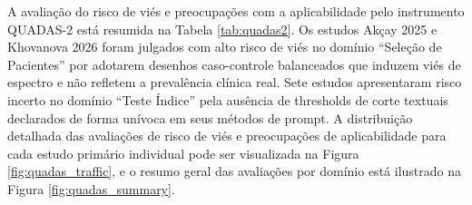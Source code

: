 \documentclass[12pt,a4paper]{article}
\begin{document}
A avaliação do risco de viés e preocupações com a aplicabilidade pelo instrumento QUADAS-2 está resumida na Tabela \ref{tab:quadas2}. Os estudos Akçay 2025 \cite{akcay} e Khovanova 2026 \cite{khovanova} foram julgados com alto risco de viés no domínio ``Seleção de Pacientes'' por adotarem desenhos caso-controle balanceados que induzem viés de espectro e não refletem a prevalência clínica real. Sete estudos apresentaram risco incerto no domínio ``Teste Índice'' pela ausência de thresholds de corte textuais declarados de forma unívoca em seus métodos de prompt. A distribuição detalhada das avaliações de risco de viés e preocupações de aplicabilidade para cada estudo primário individual pode ser visualizada na Figura \ref{fig:quadas_traffic}, e o resumo geral das avaliações por domínio está ilustrado na Figura \ref{fig:quadas_summary}.
\end{document}
